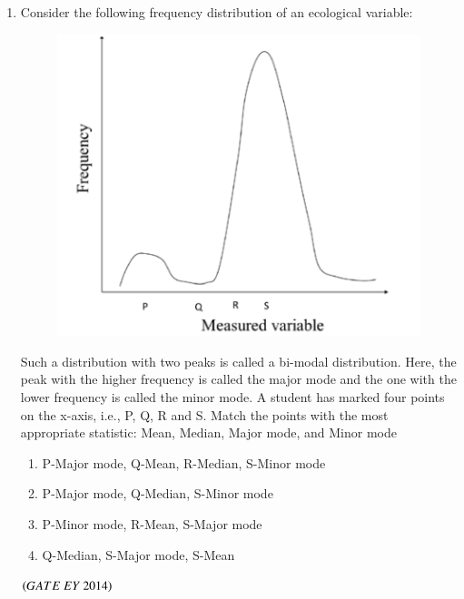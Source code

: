 \documentclass[journal]{IEEEtran}
\numberwithin{equation}{enumi}
\numberwithin{figure}{enumi}
\begin{document}
\begin{enumerate}
    \item Consider the following frequency distribution of an ecological variable:
    \begin{figure}[H]
    \centering
    \includegraphics[width=0.7\columnwidth]{figs/5.png}
    \caption{}
    \label{fig:5}
   \end{figure}
    Such a distribution with two peaks is called a bi-modal distribution. Here, the peak with the higher frequency is called the major mode and the one with the lower frequency is called the minor mode. A student has marked four points on the x-axis, i.e., P, Q, R and S. Match the points with the most appropriate statistic: Mean, Median, Major mode, and Minor mode
    \begin{enumerate}
        \item P-Major mode, Q-Mean, R-Median, S-Minor mode
        \item P-Major mode, Q-Median, S-Minor mode
        \item P-Minor mode, R-Mean, S-Major mode
        \item Q-Median, S-Major mode, S-Mean
    \end{enumerate}
    \hfill{$\brak{ GATE\ EY\ 2014}$}
    \bigskip
    

\end{enumerate}
\end{document}
